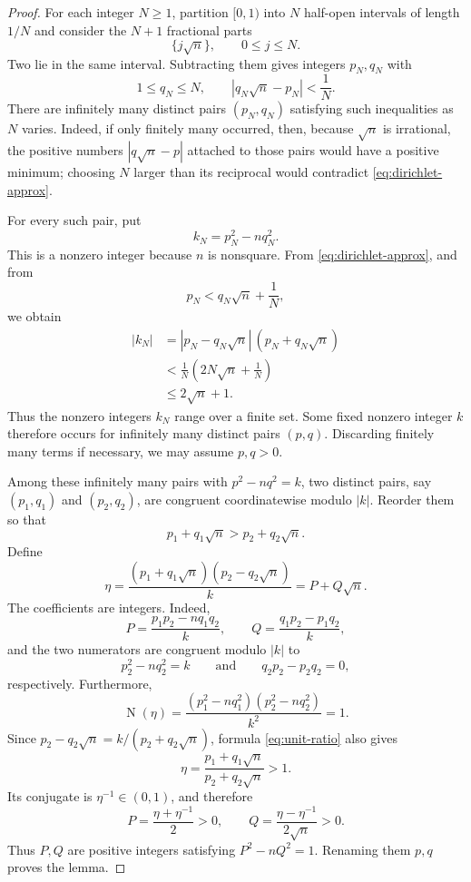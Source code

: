 \documentclass[a4paper,11pt]{amsart}
\theoremstyle{definition}
\theoremstyle{remark}
\newcommand{\Norm}{\operatorname N}
\begin{document}
\begin{proof}
For each integer $N\ge1$, partition $[0,1)$ into $N$ half-open intervals of length $1/N$ and consider the $N+1$ fractional parts
\[
\{j\sqrt n\},
\qquad 0\le j\le N.
\]
Two lie in the same interval.  Subtracting them gives integers $p_N,q_N$ with
\begin{equation}\label{eq:dirichlet-approx}
1\le q_N\le N,
\qquad
|q_N\sqrt n-p_N|<\frac1N.
\end{equation}
There are infinitely many distinct pairs $(p_N,q_N)$ satisfying such inequalities as $N$ varies.  Indeed, if only finitely many occurred, then, because $\sqrt n$ is irrational, the positive numbers $|q\sqrt n-p|$ attached to those pairs would have a positive minimum; choosing $N$ larger than its reciprocal would contradict \eqref{eq:dirichlet-approx}.

For every such pair, put
\[
k_N=p_N^2-nq_N^2.
\]
This is a nonzero integer because $n$ is nonsquare.  From \eqref{eq:dirichlet-approx}, and from
\[
p_N<q_N\sqrt n+\frac1N,
\]
we obtain
\begin{align*}
|k_N|
&=|p_N-q_N\sqrt n|\,(p_N+q_N\sqrt n)\\
&<\frac1N\left(2N\sqrt n+\frac1N\right)\\
&\le 2\sqrt n+1.
\end{align*}
Thus the nonzero integers $k_N$ range over a finite set.  Some fixed nonzero integer $k$ therefore occurs for infinitely many distinct pairs $(p,q)$.  Discarding finitely many terms if necessary, we may assume $p,q>0$.

Among these infinitely many pairs with $p^2-nq^2=k$, two distinct pairs, say $(p_1,q_1)$ and $(p_2,q_2)$, are congruent coordinatewise modulo $|k|$.  Reorder them so that
\[
p_1+q_1\sqrt n>p_2+q_2\sqrt n.
\]
Define
\begin{equation}\label{eq:unit-ratio}
\eta
 =\frac{(p_1+q_1\sqrt n)(p_2-q_2\sqrt n)}{k}
 =P+Q\sqrt n.
\end{equation}
The coefficients are integers.  Indeed,
\[
P=\frac{p_1p_2-nq_1q_2}{k},
\qquad
Q=\frac{q_1p_2-p_1q_2}{k},
\]
and the two numerators are congruent modulo $|k|$ to
\[
p_2^2-nq_2^2=k
\qquad\text{and}\qquad
q_2p_2-p_2q_2=0,
\]
respectively.  Furthermore,
\[
\Norm(\eta)
 =\frac{(p_1^2-nq_1^2)(p_2^2-nq_2^2)}{k^2}=1.
\]
Since $p_2-q_2\sqrt n=k/(p_2+q_2\sqrt n)$, formula \eqref{eq:unit-ratio} also gives
\[
\eta=\frac{p_1+q_1\sqrt n}{p_2+q_2\sqrt n}>1.
\]
Its conjugate is $\eta^{-1}\in(0,1)$, and therefore
\[
P=\frac{\eta+\eta^{-1}}2>0,
\qquad
Q=\frac{\eta-\eta^{-1}}{2\sqrt n}>0.
\]
Thus $P,Q$ are positive integers satisfying $P^2-nQ^2=1$.  Renaming them $p,q$ proves the lemma.
\end{proof}
\end{document}

